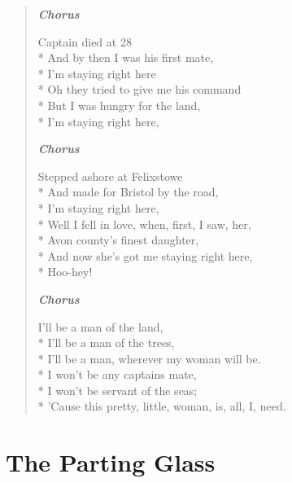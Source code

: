 \documentclass[9pt,twoside]{extarticle}
\newenvironment{xverse}{
	\begin{verse}
	\fontsize{8.5}{10.5}\selectfont
	}
	{
	\end{verse}
	\penalty 0
}
\newcommand{\chorusmark}[1][1]{%
\vspace{-0.5\stanzaskip}%
\textbf{\emph{Chorus \ifthenelse{\equal{#1}{1}}{}{$\times$ #1}}}%
\vspace{-0.5\stanzaskip}%
}
\begin{document}
\begin{xverse}
\chorusmark

Captain died at 28 \\*
And by then I was his first mate, \\*
I’m staying right here \\*
Oh they tried to give me his command \\*
But I was hungry for the land, \\*
I’m staying right here,

\chorusmark

Stepped ashore at Felixstowe \\*
And made for Bristol by the road, \\*
I’m staying right here, \\*
Well I fell in love, when, first, I saw, her, \\*
Avon county’s finest daughter, \\*
And now she’s got me staying right here, \\*
Hoo-hey!

\chorusmark

I’ll be a man of the land, \\*
I’ll be a man of the trees, \\*
I’ll be a man, wherever my woman will be. \\*
I won’t be any captains mate, \\*
I won’t be servant of the seas; \\*
’Cause this pretty, little, woman, is, all, I, need.
\end{xverse}

\section{The Parting Glass}
\end{document}

